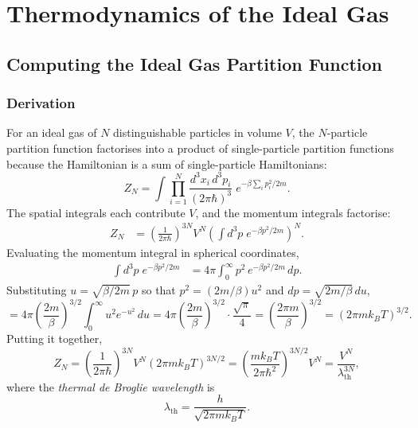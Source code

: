 \chapter{Thermodynamics of the Ideal Gas}

\section{Computing the Ideal Gas Partition Function}

\subsection{Derivation}

For an ideal gas of $N$ distinguishable particles in volume $V$, the $N$-particle partition
function factorises into a product of single-particle partition functions because the Hamiltonian
is a sum of single-particle Hamiltonians:
\begin{equation}
    Z_N = \int\prod_{i=1}^{N}\frac{d^3x_i\,d^3p_i}{(2\pi\hbar)^3}\;
          e^{-\beta\sum_i p_i^2/2m}.
\end{equation}
The spatial integrals each contribute $V$, and the momentum integrals factorise:
\begin{align}
    Z_N &= \left(\frac{1}{2\pi\hbar}\right)^{3N} V^N
           \left(\int d^3p\;e^{-\beta p^2/2m}\right)^N.
\end{align}
Evaluating the momentum integral in spherical coordinates,
\begin{align}
    \int d^3p\;e^{-\beta p^2/2m}
    &= 4\pi\int_0^\infty p^2\,e^{-\beta p^2/2m}\,dp.
\end{align}
Substituting $u = \sqrt{\beta/2m}\,p$ so that $p^2 = (2m/\beta)u^2$ and $dp = \sqrt{2m/\beta}\,du$,
\begin{equation}
    = 4\pi\left(\frac{2m}{\beta}\right)^{3/2}\int_0^\infty u^2 e^{-u^2}\,du
    = 4\pi\left(\frac{2m}{\beta}\right)^{3/2}\cdot\frac{\sqrt{\pi}}{4}
    = \left(\frac{2\pi m}{\beta}\right)^{3/2}
    = (2\pi mk_BT)^{3/2}.
\end{equation}
Putting it together,
\begin{equation}
    Z_N = \left(\frac{1}{2\pi\hbar}\right)^{3N}V^N(2\pi mk_BT)^{3N/2}
        = \left(\frac{mk_BT}{2\pi\hbar^2}\right)^{3N/2}V^N
        = \frac{V^N}{\lambda_{\text{th}}^{3N}},
\end{equation}
where the \emph{thermal de Broglie wavelength} is
\begin{equation}
    \lambda_{\text{th}} = \frac{h}{\sqrt{2\pi mk_BT}}.
\end{equation}

